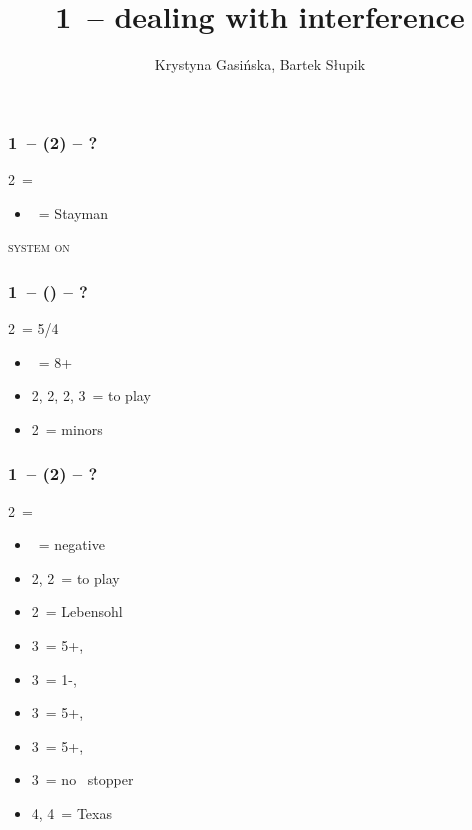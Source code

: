 \documentclass[12pt, a4paper]{article}
\title{1\ntx\ -- dealing with interference}
\author{Krystyna Gasińska, Bartek Słupik}
\begin{document}
\maketitle


\subsubsection*{1\ntx\ -- (2\clubs) -- ?}
2\clubs\ = \clubs
\begin{itemize}
    \item \dbl\ = Stayman
\end{itemize}

\textsc{system on}

\subsubsection*{1\ntx\ -- (\alrts{2\clubs}) -- ?}
2\clubs\ = 5/4 \major
\begin{itemize}
    \item \dbl\ = 8+
    \item 2\diams, 2\hearts, 2\spades, 3\clubs\ = to play
    \item 2\nt\ = minors
\end{itemize}

\subsubsection*{1\ntx\ -- (2\diams) -- ?}
2\diams\ = \diams
\begin{itemize}
    \item \dbl\ = negative
    \item 2\hearts, 2\spades\ = to play
    \item 2\nt\ = Lebensohl
    \item 3\clubs\ = 5+\hearts, \invp
    \item 3\diams\ = 1-\diams, \invp
    \item 3\hearts\ = 5+\spades, \invp
    \item 3\spades\ = 5+\clubs, \invp
    \item 3\nt\ = no \diams\ stopper
    \item 4\diams, 4\hearts\ = Texas
\end{itemize}
\end{document}
